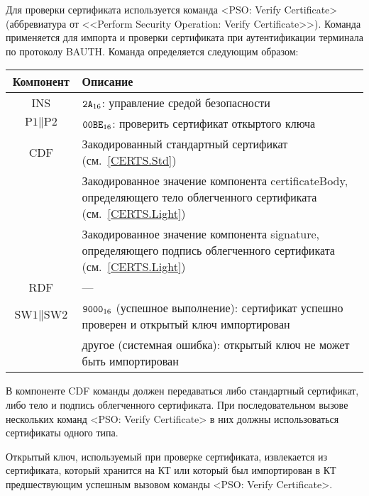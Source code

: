 Для проверки сертификата используется команда 
<PSO: Verify Certificate> (аббревиатура от <<Perform Security 
Operation: Verify Certificate>>).
Команда применяется для импорта и проверки 
сертификата при аутентификации терминала по протоколу BAUTH. 
Команда определяется следующим образом:

\noindent
\begin{tabular}{|c|p{14cm}|}
\hline
Компонент & Описание\\ 
\hline
\hline
INS & $\texttt{2A}_{16}$: управление средой безопасности \\
\hline
$\text{P1} \parallel \text{P2}$ & $\texttt{00BE}_{16}$: проверить 
сертификат откыртого ключа \\ 
\hline
CDF & Закодированный стандартный сертификат (см.~\ref{CERTS.Std})\\
 & Закодированное значение компонента certificateBody, определяющего тело 
облегченного сертификата (см.~\ref{CERTS.Light})\\
 & Закодированное значение компонента signature, определяющего подпись 
облегченного сертификата (см.~\ref{CERTS.Light})\\
\hline \hline
RDF &  --- \\
\hline
$\text{SW1} \parallel \text{SW2}$ & $\texttt{9000}_{16}$ 
(успешное выполнение): сертификат успешно проверен и 
открытый ключ импортирован \\
 & другое (системная ошибка): открытый ключ не может быть импортирован\\
\hline
\end{tabular}

В компоненте CDF команды должен передаваться либо стандартный сертификат, 
либо тело и подпись облегченного сертификата. При последовательном вызове 
нескольких команд <PSO: Verify Certificate> в них должны использоваться 
сертификаты одного типа. 

Открытый ключ, используемый при проверке сертификата, извлекается из 
сертификата, который хранится на КТ или который был импортирован в КТ 
предшествующим успешным вызовом команды <PSO: Verify Certificate>.


